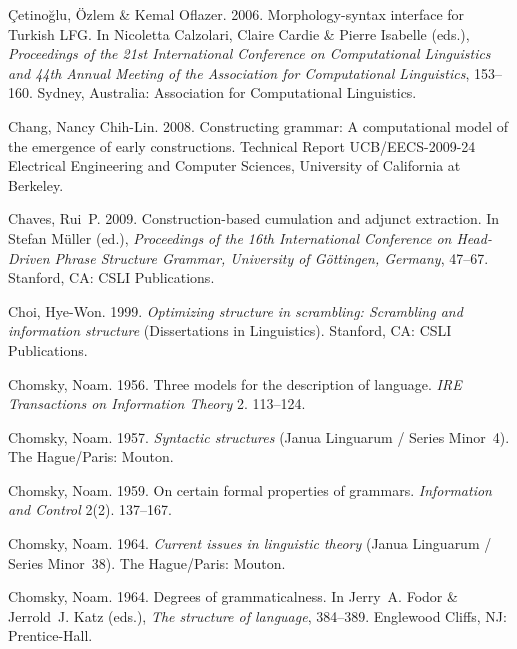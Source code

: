 \begin{thebibliography}{1420}
{\c C}etino{\u g}lu, {\"O}zlem \& Kemal Oflazer. 2006.
\newblock Morphology-syntax interface for {Turkish} {LFG}.
\newblock In Nicoletta Calzolari, Claire Cardie \& Pierre Isabelle (eds.),
  \emph{Proceedings of the {21st International Conference on Computational
  Linguistics and 44th Annual Meeting of the Association for Computational
  Linguistics}}, 153--160. Sydney, Australia: Association for Computational
  Linguistics.

Chang, Nancy Chih-Lin. 2008.
\newblock Constructing grammar: {A} computational model of the emergence of
  early constructions.
\newblock Technical Report UCB/EECS-2009-24 Electrical Engineering and Computer
  Sciences, University of California at Berkeley.

Chaves, Rui~P. 2009.
\newblock Construction-based cumulation and adjunct extraction.
\newblock In Stefan M{\"u}ller (ed.), \emph{Proceedings of the {16th
  International Conference on Head-Driven Phrase Structure Grammar, University
  of G{\"o}ttingen, Germany}}, 47--67. Stanford, CA: CSLI Publications.

Choi, Hye-Won. 1999.
\newblock \emph{Optimizing structure in scrambling: {Scrambling} and
  information structure}  (Dissertations in Linguistics).
\newblock Stanford, CA: CSLI Publications.

Chomsky, Noam. 1956.
\newblock Three models for the description of language.
\newblock \emph{IRE Transactions on Information Theory} 2. 113--124.

Chomsky, Noam. 1957.
\newblock \emph{Syntactic structures} (Janua Linguarum / Series Minor~4).
\newblock The Hague/Paris: Mouton.

Chomsky, Noam. 1959.
\newblock On certain formal properties of grammars.
\newblock \emph{Information and Control} 2(2). 137--167.

Chomsky, Noam. 1964{}.
\newblock \emph{Current issues in linguistic theory} (Janua Linguarum / Series
  Minor~38).
\newblock The Hague/Paris: Mouton.

Chomsky, Noam. 1964{}.
\newblock Degrees of grammaticalness.
\newblock In Jerry~A. Fodor \& Jerrold~J. Katz (eds.), \emph{The structure of
  language}, 384--389. Englewood Cliffs, NJ: Prentice-Hall.


\end{thebibliography}
